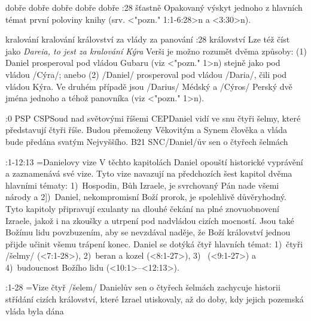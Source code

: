     {dobře}  %
    {dobře}  %
    {dobře}  %
    {dobře}  %
    {dobře}  %
:28 {šťastně} Opakovaný výskyt jednoho z hlavních témat první poloviny knihy  (srv. <"pozn." 1:1-6:28>n a <3:30>n).     

    {kralování}  %
    {kralování}  %
    {království}  %
    {za vlády}  %
    {za panování}  %
:28 {království} Lze též  číst jako {\em Dareia, to jest za kralování Kýra}     Verši je možno rozumět dvěma způsoby: (1) Daniel prosperoval pod vládou Gubaru  (viz <"pozn." 1>n) stejně jako pod vládou \x/Cýra/; anebo (2) \x/Daniel/ prosperoval pod vládou \x/Daria/, čili pod vládou Kýra. Ve druhém případě jsou  \x/Darius/ Médský a \x/Cýros/ Perský dvě jména jednoho a téhož panovníka  (viz <"pozn." 1>n).

:0 {} 
% 
        {PSP}{}%
        {CSP}{Soud nad světovými říšemi}%
        {CEP}{Daniel vidí ve snu čtyři šelmy, které představují čtyři říše.
             Budou přemoženy Věkovitým a Synem člověka a vláda bude předána
             svatým Nejvyššího.}%
        {B21}{}%
        {SNC}{\x/Daniel/ův sen o čtyřech šelmách}%

             

:1-12:13 {}={Danielovy vize} 
     V těchto kapitolách Daniel opouští historické vyprávění
     a zaznamenává své vize. Tyto vize navazují na předchozích šest kapitol dvěma hlavními tématy: 
     1)~Hospodin, Bůh Izraele, je svrchovaný Pán nade všemi národy a 
     2])~Daniel, nekompromisní Boží prorok, je spolehlivě důvěryhodný. Tyto kapitoly připravují exulanty na dlouhé čekání na plné znovuobnovení Izraele, jakož i na zkoušky a utrpení pod
        nadvládou cizích mocností. Jsou také Božímu lidu povzbuzením, aby se nevzdával naděje,
        že Boží království jednou přijde učinit všemu trápení konec. Daniel se dotýká čtyř
        hlavních témat: 1)~čtyři \x/šelmy/ (<7:1-28>),  
                        2)~beran a kozel (<8:1-27>),
                        3)~ (<9:1-27>) a 
                        4)~budoucnost Božího lidu (<10:1>--<12:13>).   


:1-28 {}={Vize čtyř \x/šelem/}
     Danielův sen o čtyřech šelmách zachycuje historii střídání cizích
     království, které Izrael utiskovaly, až do doby, kdy jejich pozemská vláda byla dána 

